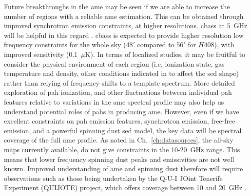                Future breakthroughs in the \acrshort{ame} may be seen if we are able to increase the number of regions with a reliable \acrshort{ame} estimation. This can be obtained through improved synchrotron emission constraints, at higher resolutions. \acrlong{cbass} at 5~GHz will be helpful in this regard \citep{irfan15}. \acrshort{cbass} is expected to provide higher resolution low frequency constraints for the whole sky (48$'$ compared to 56$'$ for $H408$), with improved sensitivity (0.1~$\mu$K). In terms of localized studies, it may be fruitful to consider the physical environment of each region (i.e. ionization state, gas temperature and density, other conditions indicated in \cite{draine98a, ali-haimoud10} to affect the \acrshort{sed} shape) rather than relying of frequency-shifts to a template spectrum. More detailed exploration of \acrshort{pah} ionization, and other fluctuations between individual \acrshort{pah} features relative to variations in the \acrshort{ame} spectral profile may also help us understand potential roles of \acrshort{pah}s in producing \acrshort{ame}. However, even if we have excellent constraints on \acrshort{pah} emission features, synchrotron emission, free-free emission, and a powerful spinning dust \acrshort{sed} model, the key data will be spectral coverage of the full \acrshort{ame} profile. As noted in Ch.~\ref{ch:datasources}, the all-sky maps currently available, do not give constraints in the 10-20~GHz range. This means that lower frequency spinning dust peaks and emissivities are not well known. Improved understanding of \acrshort{ame} and spinning dust therefore will require observations such as those being undertaken by the Q-U-I JOint Tenerife Experiment (QUIJOTE) project, which offers coverage between 10 and 20~GHz \citep{santos15}.
